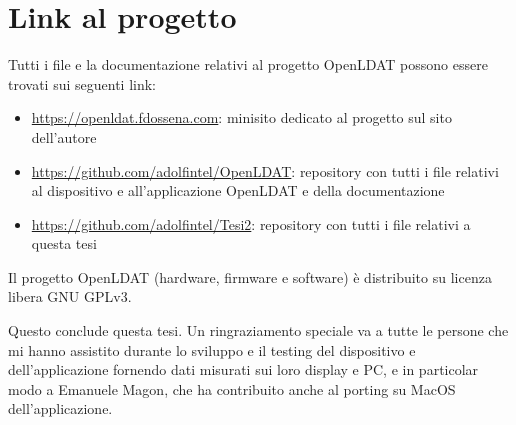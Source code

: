 \section{Link al progetto}
Tutti i file e la documentazione relativi al progetto OpenLDAT possono essere trovati sui seguenti link:\begin{itemize} %
	\item \url{https://openldat.fdossena.com}: minisito dedicato al progetto sul sito dell'autore
	\item \url{https://github.com/adolfintel/OpenLDAT}: repository con tutti i file relativi al dispositivo e all'applicazione OpenLDAT e della documentazione
	\item \url{https://github.com/adolfintel/Tesi2}: repository con tutti i file relativi a questa tesi %
\end{itemize}

Il progetto OpenLDAT (hardware, firmware e software) è distribuito su licenza libera GNU GPLv3.

Questo conclude questa tesi. Un ringraziamento speciale va a tutte le persone che mi hanno assistito durante lo sviluppo e il testing del dispositivo e dell'applicazione fornendo dati misurati sui loro display e PC, e in particolar modo a Emanuele Magon, che ha contribuito anche al porting su MacOS dell'applicazione.
